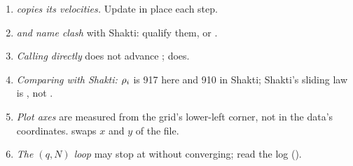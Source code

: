 \begin{enumerate}[leftmargin=1.5em]
  the source at cold bases is $-Q_b/L$ and  cannot remove the step-to-step cycle; use 
  with the host's $\tau_b$.
\item \emph{ copies its velocities.} Update  in place each step.
\item \emph{ and  name clash} with Shakti: qualify them, or .
\item \emph{Calling  directly} does not advance ;  does.
\item \emph{Comparing with Shakti:} ${\rho_i}$ is 917 here and 910 in Shakti; Shakti's sliding law is ,
  not .
\item \emph{Plot axes} are measured from the grid's lower-left corner, not in the data's coordinates.  swaps
  $x$ and $y$ of the file.
\item \emph{The $(q,N)$ loop} may stop at  without converging; read the log ().
\end{enumerate}

